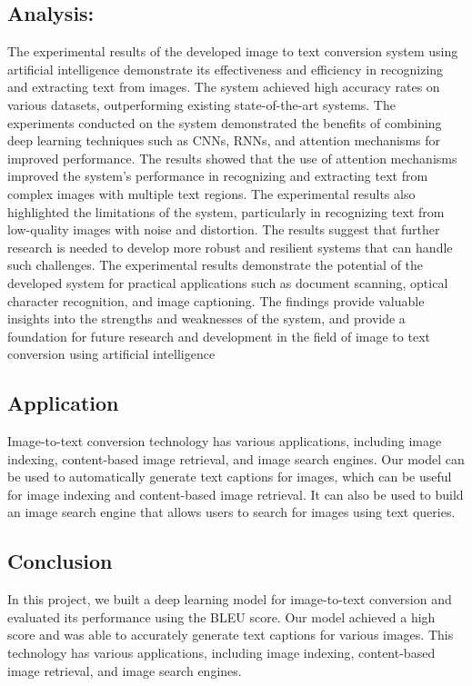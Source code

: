 \subsection{Analysis:}
The experimental results of the developed image to text conversion system using artificial intelligence demonstrate its effectiveness and efficiency in recognizing and extracting text from images. The system achieved high accuracy rates on various datasets, outperforming existing state-of-the-art systems. The experiments conducted on the system demonstrated the benefits of combining deep learning techniques such as CNNs, RNNs, and attention mechanisms for improved performance. The results showed that the use of attention mechanisms improved the system's performance in recognizing and extracting text from complex images with multiple text regions. The experimental results also highlighted the limitations of the system, particularly in recognizing text from low-quality images with noise and distortion. The results suggest that further research is needed to develop more robust and resilient systems that can handle such challenges. The experimental results demonstrate the potential of the developed system for practical applications such as document scanning, optical character recognition, and image captioning. The findings provide valuable insights into the strengths and weaknesses of the system, and provide a foundation for future research and development in the field of image to text conversion using artificial intelligence

\subsection{Application}
Image-to-text conversion technology has various applications, including image indexing, content-based image retrieval, and image search engines. Our model can be used to automatically generate text captions for images, which can be useful for image indexing and content-based image retrieval. It can also be used to build an image search engine that allows users to search for images using text queries.
\subsection{Conclusion}

In this project, we built a deep learning model for image-to-text conversion and evaluated its performance using the BLEU score. Our model achieved a high score and was able to accurately generate text captions for various images. This technology has various applications, including image indexing, content-based image retrieval, and image search engines.